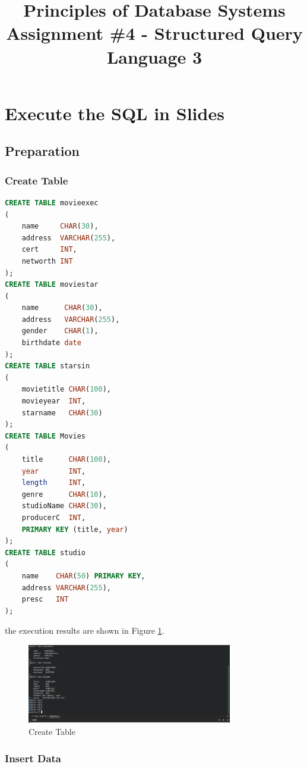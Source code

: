 \documentclass{cshwk}
\title{Principles of Database Systems\\Assignment \#4 - Structured Query Language 3}
\begin{document}
\maketitle


\section{Execute the SQL in Slides}

\subsection{Preparation}

\subsubsection{Create Table}

\begin{lstlisting}[language=sql]
CREATE TABLE movieexec
(
    name     CHAR(30),
    address  VARCHAR(255),
    cert     INT,
    networth INT
);
CREATE TABLE moviestar
(
    name      CHAR(30),
    address   VARCHAR(255),
    gender    CHAR(1),
    birthdate date
);
CREATE TABLE starsin
(
    movietitle CHAR(100),
    movieyear  INT,
    starname   CHAR(30)
);
CREATE TABLE Movies
(
    title      CHAR(100),
    year       INT,
    length     INT,
    genre      CHAR(10),
    studioName CHAR(30),
    producerC  INT,
    PRIMARY KEY (title, year)
);
CREATE TABLE studio
(
    name    CHAR(50) PRIMARY KEY,
    address VARCHAR(255),
    presc   INT
);
\end{lstlisting}

the execution results are shown in Figure \ref{fig:create-table}.

\begin{figure}[H]
    \centering
    \includegraphics[width=0.8\textwidth]{hw6-1.png}
    \caption{Create Table}
    \label{fig:create-table}
\end{figure}

\subsubsection{Insert Data}
\end{document}
